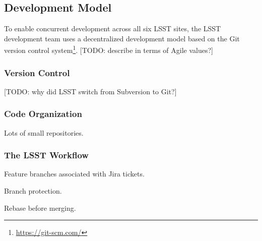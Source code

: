 \subsection{Development Model}\label{sec:development}

To enable concurrent development across all six LSST sites, the LSST development team uses a decentralized development model based on the Git version control system\footnote{\url{https://git-scm.com/}}.
[TODO: describe in terms of Agile values?]

\subsubsection{Version Control}\label{sec:git}\label{sec:subversion}

[TODO: why did LSST switch from Subversion to Git?]

\subsubsection{Code Organization}\label{sec:git_repositories}

Lots of small repositories.

\subsubsection{The LSST Workflow}\label{sec:dev_workflow}

Feature branches associated with Jira tickets.

Branch protection.

Rebase before merging.


